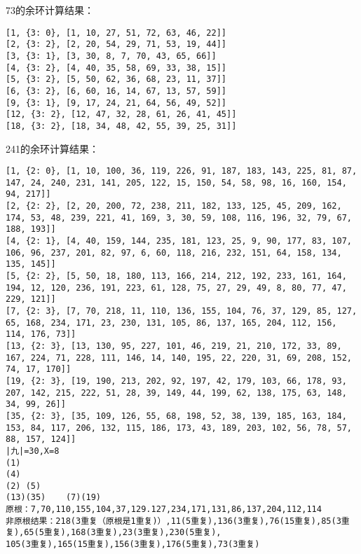 \documentclass{article}
\begin{document}
73的余环计算结果：
\begin{verbatim}
[1, {3: 0}, [1, 10, 27, 51, 72, 63, 46, 22]]
[2, {3: 2}, [2, 20, 54, 29, 71, 53, 19, 44]]
[3, {3: 1}, [3, 30, 8, 7, 70, 43, 65, 66]]
[4, {3: 2}, [4, 40, 35, 58, 69, 33, 38, 15]]
[5, {3: 2}, [5, 50, 62, 36, 68, 23, 11, 37]]
[6, {3: 2}, [6, 60, 16, 14, 67, 13, 57, 59]]
[9, {3: 1}, [9, 17, 24, 21, 64, 56, 49, 52]]
[12, {3: 2}, [12, 47, 32, 28, 61, 26, 41, 45]]
[18, {3: 2}, [18, 34, 48, 42, 55, 39, 25, 31]]
\end{verbatim}
241的余环计算结果：
\begin{verbatim}
[1, {2: 0}, [1, 10, 100, 36, 119, 226, 91, 187, 183, 143, 225, 81, 87, 147, 24, 240, 231, 141, 205, 122, 15, 150, 54, 58, 98, 16, 160, 154, 94, 217]]
[2, {2: 2}, [2, 20, 200, 72, 238, 211, 182, 133, 125, 45, 209, 162, 174, 53, 48, 239, 221, 41, 169, 3, 30, 59, 108, 116, 196, 32, 79, 67, 188, 193]]
[4, {2: 1}, [4, 40, 159, 144, 235, 181, 123, 25, 9, 90, 177, 83, 107, 106, 96, 237, 201, 82, 97, 6, 60, 118, 216, 232, 151, 64, 158, 134, 135, 145]]
[5, {2: 2}, [5, 50, 18, 180, 113, 166, 214, 212, 192, 233, 161, 164, 194, 12, 120, 236, 191, 223, 61, 128, 75, 27, 29, 49, 8, 80, 77, 47, 229, 121]]
[7, {2: 3}, [7, 70, 218, 11, 110, 136, 155, 104, 76, 37, 129, 85, 127, 65, 168, 234, 171, 23, 230, 131, 105, 86, 137, 165, 204, 112, 156, 114, 176, 73]]
[13, {2: 3}, [13, 130, 95, 227, 101, 46, 219, 21, 210, 172, 33, 89, 167, 224, 71, 228, 111, 146, 14, 140, 195, 22, 220, 31, 69, 208, 152, 74, 17, 170]]
[19, {2: 3}, [19, 190, 213, 202, 92, 197, 42, 179, 103, 66, 178, 93, 207, 142, 215, 222, 51, 28, 39, 149, 44, 199, 62, 138, 175, 63, 148, 34, 99, 26]]
[35, {2: 3}, [35, 109, 126, 55, 68, 198, 52, 38, 139, 185, 163, 184, 153, 84, 117, 206, 132, 115, 186, 173, 43, 189, 203, 102, 56, 78, 57, 88, 157, 124]]
|九|=30,X=8
(1)
(4)
(2) (5)
(13)(35)    (7)(19)
原根：7,70,110,155,104,37,129.127,234,171,131,86,137,204,112,114
非原根结果：218(3重复（原根是1重复)）,11(5重复),136(3重复),76(15重复),85(3重复),65(5重复),168(3重复),23(3重复),230(5重复),
105(3重复),165(15重复),156(3重复),176(5重复),73(3重复)

\end{verbatim}
\end{document}
